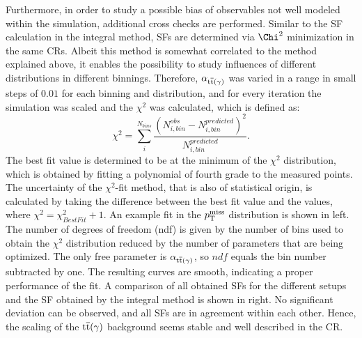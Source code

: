 Furthermore, in order to study a possible bias of observables not well modeled within the simulation, additional cross checks are performed. Similar to the SF calculation in the integral method, SFs are determined via $\Chi^2$ minimization in the same CRs. Albeit this method is somewhat correlated to the method explained above, it enables the possibility to study influences of different distributions in different binnings. Therefore, $\alpha_{{\mathrm{t}\overline{\mathrm{t}}}(\gamma)}$ was varied in a range in small steps of $0.01$ for each binning and distribution, and for every iteration the simulation was scaled and the $\chi^2$ was calculated, which is defined as:
\begin{equation}
 \chi^2=\sum_i^{N_{bins}} \frac{\left(N_{i,bin}^{obs}-N_{i,bin}^{predicted}\right)^2}{N_{i,bin}^{predicted}}.
\end{equation}
The best fit value is determined to be at the minimum of the $\chi^2$ distribution, which is obtained by fitting a polynomial of fourth grade to the measured points. The uncertainty of the $\chi^2$-fit method, that is also of statistical origin, is calculated by taking the difference between the best fit value and the values, where $\chi^2=\chi^2_{BestFit}+1$. An example fit in the $p_{\mathrm{T}}^\text{miss}$ distribution is shown in  left. The number of degrees of freedom (ndf) is given by the number of bins used to obtain the $\chi^2$ distribution reduced by the number of parameters that are being optimized. The only free parameter is $\alpha_{{\mathrm{t}\overline{\mathrm{t}}}(\gamma)}$, so $ndf$ equals the bin number subtracted by one. The resulting curves are smooth, indicating a proper performance of the fit. A comparison of all obtained SFs for the different setups and the SF obtained by the integral method is shown in  right. No significant deviation can be observed, and all SFs are in agreement within each other. Hence, the scaling of the ${\mathrm{t}\overline{\mathrm{t}}}(\gamma)$ background seems stable and well described in the CR.
